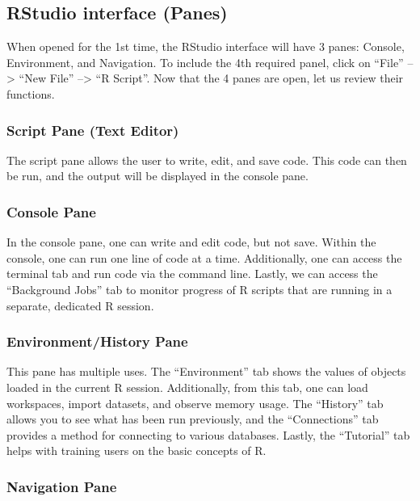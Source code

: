 \documentclass[
  letterpaper,
  DIV=11,
  numbers=noendperiod]{scrreprt}
\begin{document}
\subsection{RStudio interface (Panes)}\label{rstudio-interface-panes}

When opened for the 1st time, the RStudio interface will have 3 panes:
Console, Environment, and Navigation. To include the 4th required panel,
click on ``File'' --\textgreater{} ``New File'' --\textgreater{} ``R
Script''. Now that the 4 panes are open, let us review their functions.

\subsubsection{Script Pane (Text Editor)}\label{script-pane-text-editor}

The script pane allows the user to write, edit, and save code. This code
can then be run, and the output will be displayed in the console pane.

\subsubsection{Console Pane}\label{console-pane}

In the console pane, one can write and edit code, but not save. Within
the console, one can run one line of code at a time. Additionally, one
can access the terminal tab and run code via the command line. Lastly,
we can access the ``Background Jobs'' tab to monitor progress of R
scripts that are running in a separate, dedicated R session.

\subsubsection{Environment/History Pane}\label{environmenthistory-pane}

This pane has multiple uses. The ``Environment'' tab shows the values of
objects loaded in the current R session. Additionally, from this tab,
one can load workspaces, import datasets, and observe memory usage. The
``History'' tab allows you to see what has been run previously, and the
``Connections'' tab provides a method for connecting to various
databases. Lastly, the ``Tutorial'' tab helps with training users on the
basic concepts of R.

\subsubsection{Navigation Pane}\label{navigation-pane}
\end{document}
